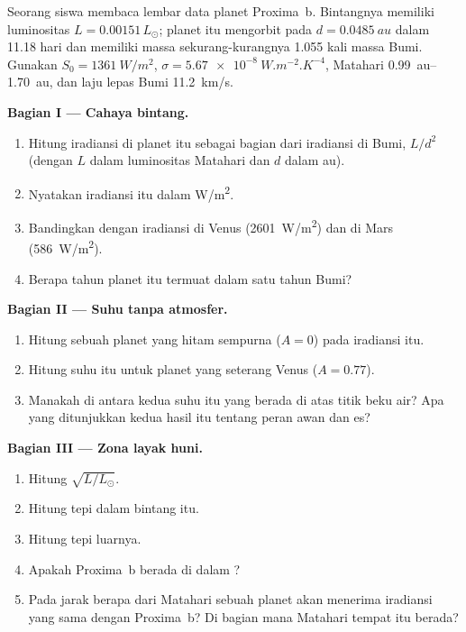 \begin{problem}
\label{pb:g10:habitable-planet:1}
Seorang siswa membaca lembar data planet Proxima~b. Bintangnya memiliki
luminositas $L = 0.00151\,L_\odot$; planet itu mengorbit pada
$d = \qty{0.0485}{au}$ dalam 11.18 hari dan memiliki massa
sekurang-kurangnya 1.055 kali massa Bumi. Gunakan
$S_0 = \qty{1361}{W/m^2}$, $\sigma = \qty{5.67e-8}{W.m^{-2}.K^{-4}}$,  Matahari \qtyrange{0.99}{1.70}{au}, dan laju lepas Bumi
\qty{11.2}{km/s}.

\medskip
\noindent\textbf{Bagian I --- Cahaya bintang.}
\begin{enumerate}
  \item Hitung iradiansi di planet itu sebagai bagian dari iradiansi di Bumi,
        $L/d^2$ (dengan $L$ dalam luminositas Matahari dan $d$ dalam au).
  \item Nyatakan iradiansi itu dalam \unit{W/m^2}.
  \item Bandingkan dengan iradiansi di Venus (\qty{2601}{W/m^2}) dan di
        Mars (\qty{586}{W/m^2}).
  \item Berapa tahun planet itu termuat dalam satu tahun Bumi?
\end{enumerate}

\medskip
\noindent\textbf{Bagian II --- Suhu tanpa atmosfer.}
\begin{enumerate}[resume]
  \item Hitung  sebuah planet yang hitam sempurna
        ($A = 0$) pada iradiansi itu.
  \item Hitung suhu itu untuk planet yang seterang Venus ($A = 0.77$).
  \item Manakah di antara kedua suhu itu yang berada di atas titik beku air?
        Apa yang ditunjukkan kedua hasil itu tentang peran awan dan
        es?
\end{enumerate}

\medskip
\noindent\textbf{Bagian III --- Zona layak huni.}
\begin{enumerate}[resume]
  \item Hitung $\sqrt{L/L_\odot}$.
  \item Hitung tepi dalam  bintang itu.
  \item Hitung tepi luarnya.
  \item Apakah Proxima~b berada di dalam ?
  \item Pada jarak berapa dari Matahari sebuah planet akan menerima iradiansi
        yang sama dengan Proxima~b? Di bagian mana  Matahari
        tempat itu berada?
\end{enumerate}


\end{problem}
